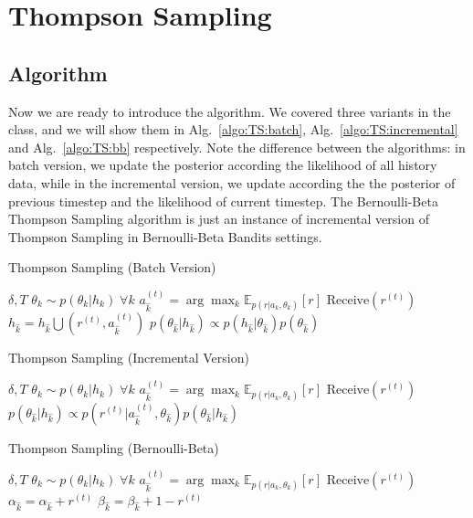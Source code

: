 \documentclass[11pt]{article}
\begin{document}
\section{Thompson Sampling}
\subsection{Algorithm}
Now we are ready to introduce the algorithm. We covered three variants in the class, and we will show them in Alg.~\ref{algo:TS:batch}, Alg.~\ref{algo:TS:incremental} and Alg.~\ref{algo:TS:bb} respectively. Note the difference between the algorithms: in batch version, we update the posterior according the likelihood of all history data, while in the incremental version, we update according the the posterior of previous timestep and the likelihood of current timestep. The Bernoulli-Beta Thompson Sampling algorithm is just an instance of incremental version of Thompson Sampling in Bernoulli-Beta Bandits settings.
\begin{algorithm}[H]
\caption{Thompson Sampling (Batch Version)}
\label{algo:TS:batch}
\begin{algorithmic}[1]
\REQUIRE $\delta, T$
\STATE $\theta_k \sim p(\theta_k|h_k)\; \forall k$
\STATE $a_{\widehat{k}}^{(t)} = \arg\max_{k} \mathbb{E}_{p(r|a_k, \theta_k)}[r]$
\STATE $\text{Receive}(r^{(t)})$
\STATE $h_{\widehat{k}} = h_{\widehat{k}} \bigcup (r^{(t)}, a_{\widehat{k}}^{(t)})$
\STATE $p(\theta_{\widehat{k}} | h_{\widehat{k}}) \propto p(h_{\widehat{k}}|\theta_{\widehat{k}}) p(\theta_{\widehat{k}} )$
\ENDFOR
\end{algorithmic}
\end{algorithm}

\begin{algorithm}[H]
\caption{Thompson Sampling (Incremental Version)}
\label{algo:TS:incremental}
\begin{algorithmic}[1]
\REQUIRE $\delta, T$
\STATE $\theta_k \sim p(\theta_k|h_k)\; \forall k$
\STATE $a_{\widehat{k}}^{(t)} = \arg\max_{k} \mathbb{E}_{p(r|a_k, \theta_k)}[r]$
\STATE $\text{Receive}(r^{(t)})$
\STATE $p(\theta_{\widehat{k}} | h_{\widehat{k}}) \propto p(r^{(t)}|a^{(t)}_{\widehat{k}}, \theta_{\widehat{k}}) p(\theta_{\widehat{k}} | h_{\widehat{k}})$
\ENDFOR
\end{algorithmic}
\end{algorithm}

\begin{algorithm}[H]
\caption{Thompson Sampling (Bernoulli-Beta)}
\label{algo:TS:bb}
\begin{algorithmic}[1]
\REQUIRE $\delta, T$
\STATE $\theta_k \sim p(\theta_k|h_k)\; \forall k$
\STATE $a_{\widehat{k}}^{(t)} = \arg\max_{k} \mathbb{E}_{p(r|a_k, \theta_k)}[r]$
\STATE $\text{Receive}(r^{(t)})$
\STATE $\alpha_{\widehat{k}} = \alpha_{\widehat{k}} + r^{(t)}$
\STATE $\beta_{\widehat{k}} = \beta_{\widehat{k}} +1- r^{(t)}$
\ENDFOR
\end{algorithmic}
\end{algorithm}
\end{document}

